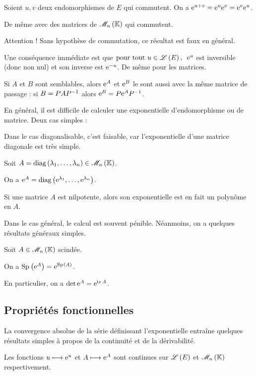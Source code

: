 \begin{prop}
Soient \(u,v\) deux endomorphismes de \(E\) qui commutent. On a \(\mathrm{e}^{u+v}=\mathrm{e}^{u}\mathrm{e}^{v}=\mathrm{e}^{v}\mathrm{e}^{u}\).

De même avec des matrices de \(\M{n}\) qui commutent.
\end{prop}

Attention ! Sans hypothèse de commutation, ce résultat est faux en général.

Une conséquence immédiate est que \(\quantifs{\tpt u\in\Lendo{E}}\e{u}\) est inversible (donc non nul) et son inverse est \(\mathrm{e}^{-u}\). De même pour les matrices.

Si \(A\) et \(B\) sont semblables, alors \(\mathrm{e}^{A}\) et \(\mathrm{e}^{B}\) le sont aussi avec la même matrice de passage : si \(B=PAP^{-1}\) alors \(\mathrm{e}^{B}=P\mathrm{e}^{A}P^{-1}\).

En général, il est difficile de calculer une exponentielle d'endomorphisme ou de matrice. Deux cas simples :

Dans le cas diagonalisable, c'est faisable, car l'exponentielle d'une matrice diagonale est très simple.

\begin{prop}
Soit \(A=\diag{\lambda_1,\dots,\lambda_n}\in\M{n}\).

On a \(\mathrm{e}^{A}=\operatorname{diag}\left(\mathrm{e}^{\lambda_1},\dots,\mathrm{e}^{\lambda_n}\right)\).
\end{prop}

Si une matrice \(A\) est nilpotente, alors son exponentielle est en fait un polynôme en \(A\).

Dans le cas général, le calcul est souvent pénible. Néanmoins, on a quelques résultats généraux simples.

\begin{prop}
Soit \(A\in\M{n}\) scindée.

On a \(\Sp{\e{A}}=\e{\Sp{A}}\).

En particulier, on a \(\det\mathrm{e}^{A}=\mathrm{e}^{\operatorname{tr} A}\).
\end{prop}

\subsection{Propriétés fonctionnelles}

La convergence absolue de la série définissant l'exponentielle entraîne quelques résultats simples à propos de la continuité et de la dérivabilité.

\begin{prop}
Les fonctions \(u\longmapsto\mathrm{e}^{u}\) et \(A\longmapsto\mathrm{e}^{A}\) sont continues sur \(\mathscr{L}\left(E\right)\) et \(\M{n}\) respectivement.
\end{prop}

